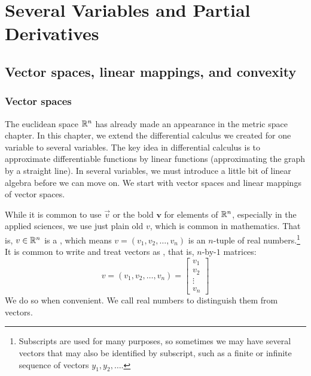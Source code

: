 \chapter{Several Variables and Partial Derivatives} \label{pd:chapter}


\section{Vector spaces, linear mappings, and convexity}
\label{sec:vectorspaces}


\subsection{Vector spaces}

The euclidean space ${\mathbb{R}}^n$ has already made an appearance in the metric
space chapter.  In this chapter, we extend the differential calculus
we created for one variable to several variables.  The key idea in
differential calculus is to approximate differentiable functions by linear
functions (approximating the graph by a straight line).
In several variables, we must introduce a little bit of linear
algebra before we can move on.
We start with vector spaces and linear mappings of vector spaces.

While it is common to use $\vec{v}$ or the bold
$\mathbf{v}$ for elements of ${\mathbb{R}}^n$,
especially in the applied sciences,
we use just plain old $v$, which is common in mathematics.
That is, $v \in {\mathbb{R}}^n$ is a \emph{}, which means 
$v = (v_1,v_2,\ldots,v_n)$ is an $n$-tuple of
real numbers.\footnote{Subscripts are used for many purposes,
so sometimes we may have several vectors that may also
be identified by subscript, such as a finite or infinite sequence of
vectors $y_1,y_2,\ldots$.}
It is common to write and treat vectors as
\emph{}, that is, $n$-by-$1$ matrices:
\begin{equation*}
v =
(v_1,v_2,\ldots,v_n) =
{ \left[
\begin{smallmatrix}
v_1 \\ v_2 \\ \vdots \\ v_n
\end{smallmatrix}
\right]
}
\end{equation*}
We do so when convenient.
We call real numbers
\emph{} to distinguish them from vectors.

